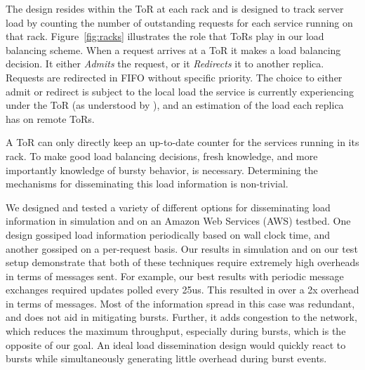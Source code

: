 The \daronpon design resides within the ToR at each rack and is designed to
track server load by counting the number of outstanding requests for each
service running on that rack. Figure~\ref{fig:racks} illustrates the role that
ToRs play in our load balancing scheme.  When a request arrives at a ToR it
makes a load balancing decision. It either \textit{Admits} the request, or it
\textit{Redirects} it to another replica. 
%
Requests are redirected in FIFO without specific priority.
%
The choice to either admit or redirect is subject to the local load the service is currently experiencing
under the ToR (as understood by \daronpon), and an estimation of the load each replica has on remote ToRs.


A ToR can only directly keep an up-to-date counter for the services running in
its rack. To make good load balancing decisions, fresh knowledge, and more
importantly knowledge of bursty behavior, is necessary.  Determining the
mechanisms for disseminating this load information is non-trivial.

We designed and tested a variety of different options for disseminating load
information in simulation and on an Amazon Web Services (AWS) testbed.  One
design gossiped load information periodically based on wall clock time, and
another gossiped on a per-request basis. Our results in simulation and on our
test setup demonstrate that both of these techniques require extremely high
overheads in terms of messages sent.  For example, our best results with
periodic message exchanges required updates polled every 25us. This resulted in
over a 2x overhead in terms of messages. Most of the information spread in this
case was redundant, and does not aid in mitigating bursts.  Further, it adds
congestion to the network, which reduces the maximum throughput, especially
during bursts, which is the opposite of our goal. An ideal load dissemination
design would quickly react to bursts while simultaneously generating little
overhead during burst events.

